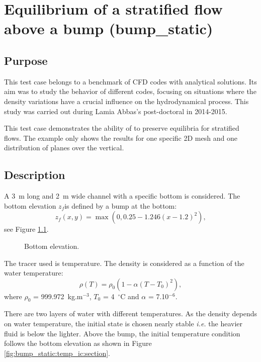\chapter{Equilibrium of a stratified flow above a bump (bump\_static)}
%
%
\section{Purpose}
%
This test case belongs to a benchmark of CFD codes with analytical solutions.
Its aim was to study the behavior of different codes, focusing on situations
where the density variations have a crucial influence on the hydrodynamical
process.
This study was carried out during Lamia Abbas's post-doctoral \cite{Abbas2015}
in 2014-2015.

This test case demonstrates the ability of  to preserve
equilibria for stratified flows.
The example only shows the results for one specific 2D mesh and one distribution
of planes over the vertical.

%
\section{Description}
%
A 3~m long and 2~m wide channel with a specific bottom is considered.
The bottom elevation $z_f$is defined by a bump at the bottom:
\begin{equation}
  z_f(x,y) = \max \left(0,0.25-1.246(x-1.2)^2\right),
\end{equation}
see Figure \ref{fig:bump_static:bathy}.

\begin{figure}[H]
 \centering
  \caption{Bottom elevation.}\label{fig:bump_static:bathy}
\end{figure}

The tracer used is temperature.
The density is considered as a function of the water temperature:
\begin{equation}
  \rho(T) = \rho_0 \left(1 - \alpha (T-T_0)^2\right),
\end{equation}
where $\rho_0$ = 999.972~kg.m$^{-3}$, $T_0$ = 4~$^{\circ}$C
and $\alpha$ = 7.10$^{-6}$.

There are two layers of water with different temperatures.
As the density depends on water temperature, the initial state
is chosen nearly stable \emph{i.e.} the heavier fluid is below the lighter.
Above the bump, the initial temperature condition follows the bottom elevation
as shown in Figure \ref{fig:bump_static:temp_ic:section}.

